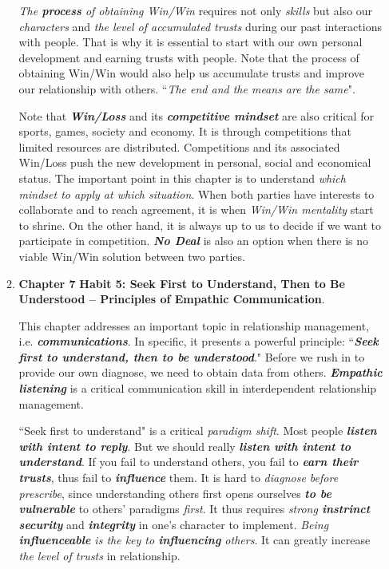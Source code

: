 \documentclass[11pt]{article}
\begin{document}
\begin{enumerate}
\begin{enumerate}
\emph{The \textbf{process} of obtaining Win/Win} requires not only \emph{skills} but also our \emph{characters} and \emph{the level of accumulated trusts} during our past interactions with people. That is why it is essential to start with our own personal development and earning trusts with people. Note that the process of obtaining Win/Win would also help us accumulate trusts and improve our relationship with others. ``\emph{The end and the means are the same}". 

Note that \emph{\textbf{Win/Loss}} and its \emph{\textbf{competitive mindset}} are also critical for sports, games, society and economy. It is through competitions that limited resources are distributed. Competitions and its associated Win/Loss push the new development in personal, social and economical status. The important point in this chapter is to understand \emph{which mindset to apply at which situation}. When both parties have interests to collaborate and to reach agreement, it is when \emph{Win/Win mentality} start to shrine. On the other hand, it is always up to us to decide if we want to participate in competition. \emph{\textbf{No Deal}} is also an option when there is no viable Win/Win solution between two parties.


\item \textbf{Chapter 7} \textbf{Habit 5: Seek First to Understand, Then to Be Understood -- Principles of Empathic Communication}. 

This chapter addresses an important topic in relationship management, i.e. \emph{\textbf{communications}}. In specific, it presents a powerful principle: ``\emph{\textbf{Seek first to understand, then to be understood}}." Before we rush in to provide our own diagnose, we need to obtain data from others. \emph{\textbf{Empathic listening}} is a critical communication skill in interdependent relationship management.

``Seek first to understand" is a critical \emph{paradigm shift}. Most people \emph{\textbf{listen with intent to reply}}. But we should really \emph{\textbf{listen with intent to understand}}. If you fail to understand others, you fail to \emph{\textbf{earn their trusts}}, thus fail to \emph{\textbf{influence}} them. It is hard to \emph{diagnose before prescribe}, since understanding others first opens ourselves \emph{\textbf{to be vulnerable}} to others' paradigms \emph{first}. It thus requires \emph{strong \textbf{instrinct security}} and \emph{\textbf{integrity}} in one's character to implement.  \emph{Being \textbf{influenceable} is the key to \textbf{influencing} others}. It can greatly increase \emph{the level of trusts} in relationship.


\end{enumerate}
\end{enumerate}
\end{document}

